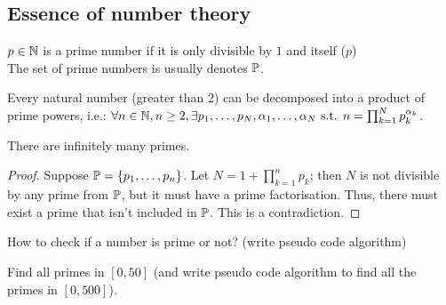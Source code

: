 \subsection{Essence of number theory}
\begin{definition}[Prime]
    $p \in \mathbb{N}$ is a prime number if it is only divisible by $1$ and itself ($p$)\\
    The set of prime numbers is usually denotes $\mathbb{P}$.
\end{definition}
\begin{property}
    Every natural number (greater than $2$) can be decomposed into a product of prime powers, i.e.:
    $\forall n \in \mathbb{N}, n \geq 2, \exists p_1, \dots, p_N, \alpha_1, \dots, \alpha_N \text{ s.t. } n = \prod_{k=1}^{N} p_k^{\alpha_k}$.
\end{property}
\begin{property}[$\card{\primes}=\infty$]
    There are infinitely many primes.
\end{property}
\begin{proof}
    Suppose $\mathbb{P} = \{ p_1, \dots, p_n \}$.
    Let $N = 1 + \prod_{k=1}^{n} p_k$; then $N$ is not divisible by any prime from $\mathbb{P}$, but it must have a prime factorisation.
    Thus, there must exist a prime that isn't included in $\mathbb{P}$.
    This is a contradiction.
\end{proof}
\begin{question}
    How to check if a number is prime or not? (write pseudo code algorithm)
    
    Find all primes in $\left[0,50\right]$ (and write pseudo code algorithm to find all the primes in $\left[0,500\right]$).
\end{question}